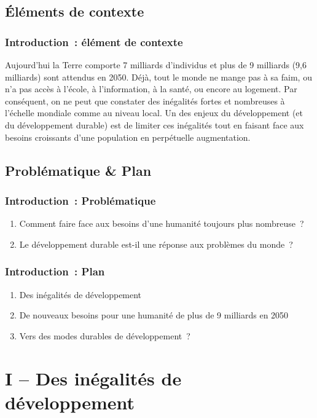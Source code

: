 \documentclass[C]{beamer}
\begin{document}
	\subsection*{\'Eléments de contexte}
	\begin{frame}
	\frametitle{Introduction~: élément de contexte}
	Aujourd'hui la Terre comporte 7 milliards d'individus et plus de 9 milliards (9,6 milliards) sont attendus en 2050. Déjà, tout le monde ne mange pas à sa faim, ou n'a pas accès à l'école, à l'information, à la santé, ou encore au logement. Par conséquent, on ne peut que constater des inégalités fortes et nombreuses à l'échelle mondiale comme au niveau local. Un des enjeux du développement (et du développement durable) est de limiter ces inégalités tout en faisant face aux besoins croissants d'une population en perpétuelle augmentation.
	\end{frame}
	
	\subsection*{Problématique \& Plan}
	\begin{frame}
	\frametitle{Introduction~: Problématique}
	\begin{enumerate}
	\item Comment faire face aux besoins d'une humanité toujours plus nombreuse~?\\
\pause
	\item Le développement durable est-il une réponse aux problèmes du monde~?
	\end{enumerate}
	\end{frame}
	
	\begin{frame}
	\frametitle{Introduction~: Plan}
	\begin{enumerate}
	\item Des inégalités de développement
	\item De nouveaux besoins pour une humanité de plus de 9 milliards en 2050
	\item Vers des modes durables de développement~?
	\end{enumerate}
	\end{frame}
	
	\section*{I -- Des inégalités de développement}
\end{document}
